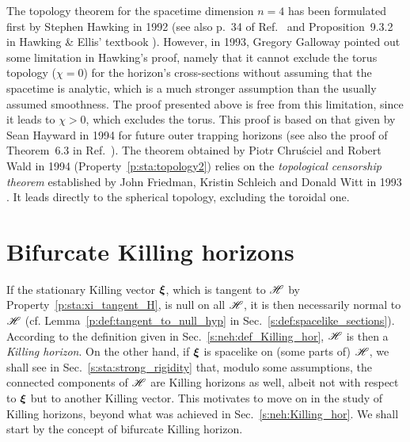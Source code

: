 \begin{hist}
The topology theorem for the spacetime dimension $n=4$ has been formulated
first by Stephen Hawking in 1992 \cite{Hawki72}
(see also p.~34 of Ref.~\cite{Hawki73} and Proposition~9.3.2 in Hawking \& Ellis' textbook
\cite{HawkiE73}).
However, in 1993, Gregory Galloway \cite{Gallo94}
pointed out some limitation in Hawking's proof, namely that it cannot
exclude the torus topology ($\chi = 0$) for the horizon's cross-sections
without assuming that the spacetime is analytic, which is a much stronger
assumption than the usually assumed smoothness.
The proof presented above is free from this limitation, since it leads to
$\chi > 0$, which excludes the torus. This proof is based on that given
by Sean Hayward in 1994 \cite{Haywa94}
for future outer trapping horizons (see also the proof of Theorem~6.3 in Ref.~\cite{Newma87}).
The theorem obtained by Piotr Chru\'sciel
and Robert Wald in 1994 \cite{ChrusW94b}
(Property~\ref{p:sta:topology2})
relies on the \emph{topological censorship theorem} established by
John Friedman, Kristin Schleich
and Donald Witt in 1993 \cite{FriedSW93}.
It leads directly to the spherical topology, excluding the toroidal one.
\end{hist}



\section{Bifurcate Killing horizons} \label{s:sta:bifur_Killing_hor}

If the stationary Killing vector $\bm{\xi}$,
which is tangent to $\mathscr{H}$ by Property~\ref{p:sta:xi_tangent_H},
is null on all $\mathscr{H}$, it is then necessarily normal to $\mathscr{H}$
(cf. Lemma~\ref{p:def:tangent_to_null_hyp} in Sec.~\ref{s:def:spacelike_sections}).
According to the definition given in Sec.~\ref{s:neh:def_Killing_hor},
$\mathscr{H}$ is then a \emph{Killing horizon}.
On the other hand, if $\bm{\xi}$ is spacelike on (some parts of) $\mathscr{H}$,
we shall see in Sec.~\ref{s:sta:strong_rigidity} that, modulo some
assumptions, the connected components of $\mathscr{H}$ are Killing
horizons as well, albeit not with respect to $\bm{\xi}$ but to another
Killing vector. This motivates to move on in the study of Killing horizons,
beyond what was achieved in Sec.~\ref{s:neh:Killing_hor}. We shall start
by the concept of bifurcate Killing horizon.

